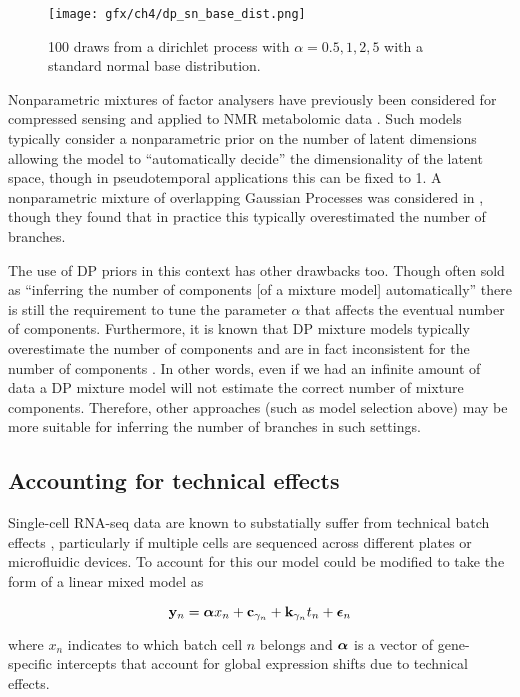 \begin{figure}
	\centering
	\texttt{[image: gfx/ch4/dp\_sn\_base\_dist.png]}
	\caption{100 draws from a dirichlet process with $\alpha = 0.5, 1, 2, 5$ with a standard normal base distribution.} \label{fig:dp}
\end{figure}

Nonparametric mixtures of factor analysers have previously been considered for compressed sensing \cite{chen2010compressive} and applied to NMR metabolomic data \cite{murphy2017infinite}. Such models typically consider a nonparametric prior on the number of latent dimensions allowing the model to ``automatically decide'' the dimensionality of the latent space, though in pseudotemporal applications this can be fixed to 1. A nonparametric mixture of overlapping Gaussian Processes was considered in \cite{lonnberg2016temporal}, though they found that in practice this typically overestimated the number of branches.

The use of DP priors in this context has other drawbacks too. Though often sold as ``inferring the number of components [of a mixture model] automatically'' there is still the requirement to tune the parameter $\alpha$ that affects the eventual number of components. Furthermore, it is known that DP mixture models typically overestimate the number of components and are in fact inconsistent for the number of components \cite{miller2013simple}. In other words, even if we had an infinite amount of data a DP mixture model will not estimate the correct number of mixture components. Therefore, other approaches (such as model selection above) may be more suitable for inferring the number of branches in such settings.

\subsection{Accounting for technical effects}

Single-cell RNA-seq data are known to substatially suffer from technical batch effects \cite{tung2017batch,hicks2017missing}, particularly if multiple cells are sequenced across different plates or microfluidic devices. To account for this our model could be modified to take the form of a linear mixed model as

\begin{equation}
	\mathbf{y}_n = \bm{\alpha} x_n + \mathbf{c}_{\gamma_n} + \mathbf{k}_{\gamma_n} t_n + \bm{\epsilon}_n
\end{equation}

where $x_n$ indicates to which batch cell $n$ belongs and $\bm{\alpha}$ is a vector of gene-specific intercepts that account for global expression shifts due to technical effects.